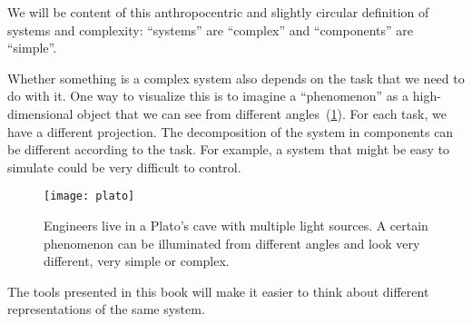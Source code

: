 We will be content of this anthropocentric and slightly circular definition of systems and complexity: ``systems'' are ``complex'' and ``components'' are ``simple''.

Whether something is a complex system also depends on the task that we need to do with it.
One way to visualize this is to imagine a ``phenomenon'' as a high-dimensional object that we can see from different angles~(\cref{fig:aspects}).
For each task, we have a different projection.
The decomposition of the system in components can be different according to the task.
For example, a system that might be easy to simulate could be very difficult to control.

\begin{figure}[h]
    \centering
    \texttt{[image: plato]}
    \caption{
        Engineers live in a Plato's cave with multiple light sources.
        A certain phenomenon can be illuminated from different angles and look very different, very simple or complex.
    }
    \label{fig:aspects}
\end{figure}


The tools presented in this book will make it easier to think about different representations of the same system.






